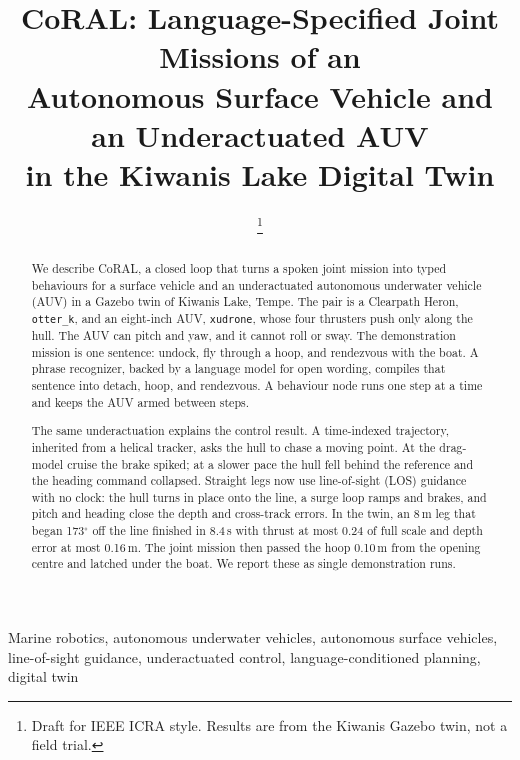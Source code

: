 \documentclass[conference]{IEEEtran}
\def\CoRAL{CoRAL}
\def\otterk{\texttt{otter\_k}}
\def\xudrone{\texttt{xudrone}}
\begin{document}
\title{CoRAL: Language-Specified Joint Missions of an\\
Autonomous Surface Vehicle and an Underactuated AUV\\
in the Kiwanis Lake Digital Twin}

\author{
\thanks{Draft for IEEE ICRA style. Results are from the Kiwanis Gazebo twin, not a field trial.}}

\maketitle

\begin{abstract}
We describe \CoRAL{}, a closed loop that turns a spoken joint mission into typed behaviours for a surface vehicle and an underactuated autonomous underwater vehicle (AUV) in a Gazebo twin of Kiwanis Lake, Tempe. The pair is a Clearpath Heron, \otterk{}, and an eight-inch AUV, \xudrone{}, whose four thrusters push only along the hull. The AUV can pitch and yaw, and it cannot roll or sway. The demonstration mission is one sentence: undock, fly through a hoop, and rendezvous with the boat. A phrase recognizer, backed by a language model for open wording, compiles that sentence into detach, hoop, and rendezvous. A behaviour node runs one step at a time and keeps the AUV armed between steps.

The same underactuation explains the control result. A time-indexed trajectory, inherited from a helical tracker, asks the hull to chase a moving point. At the drag-model cruise the brake spiked; at a slower pace the hull fell behind the reference and the heading command collapsed. Straight legs now use line-of-sight (LOS) guidance with no clock: the hull turns in place onto the line, a surge loop ramps and brakes, and pitch and heading close the depth and cross-track errors. In the twin, an 8\,m leg that began 173$^\circ$ off the line finished in 8.4\,s with thrust at most 0.24 of full scale and depth error at most 0.16\,m. The joint mission then passed the hoop 0.10\,m from the opening centre and latched under the boat. We report these as single demonstration runs.
\end{abstract}

\begin{IEEEkeywords}
Marine robotics, autonomous underwater vehicles, autonomous surface vehicles, line-of-sight guidance, underactuated control, language-conditioned planning, digital twin
\end{IEEEkeywords}
\end{document}
